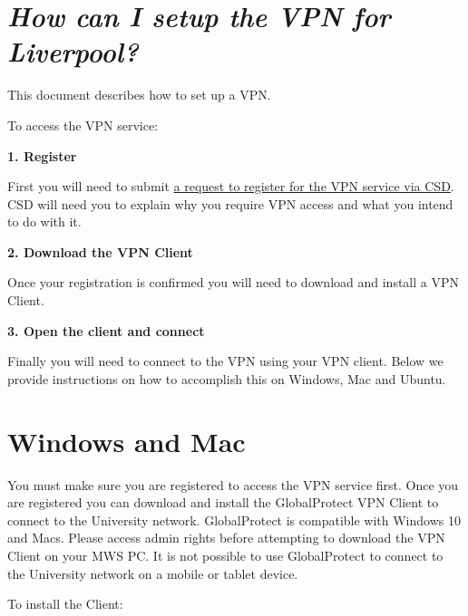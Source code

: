 \documentclass[
]{book}
\begin{document}
\hypertarget{how-can-i-setup-the-vpn-for-liverpool}{%
\section{\texorpdfstring{\emph{How can I setup the VPN for Liverpool?}}{How can I setup the VPN for Liverpool?}}\label{how-can-i-setup-the-vpn-for-liverpool}}

This document describes how to set up a VPN.

To access the VPN service:

\textbf{1. Register}

First you will need to submit \href{https://liverpool.service-now.com/sp?id=sc_cat_item\&sys_id=bd8d37f1376ba60051a3532e53990e3f}{a request to register for the VPN service via CSD}. CSD will need you to explain why you require VPN access and what you intend to do with it.

\textbf{2. Download the VPN Client}

Once your registration is confirmed you will need to download and install a VPN Client.

\textbf{3. Open the client and connect}

Finally you will need to connect to the VPN using your VPN client. Below we provide instructions on how to accomplish this on Windows, Mac and Ubuntu.

\hypertarget{windows-and-mac}{%
\section{Windows and Mac}\label{windows-and-mac}}

You must make sure you are registered to access the VPN service first.
Once you are registered you can download and install the GlobalProtect VPN Client to connect to the University network.
GlobalProtect is compatible with Windows 10 and Macs.
Please access admin rights before attempting to download the VPN Client on your MWS PC.
It is not possible to use GlobalProtect to connect to the University network on a mobile or tablet device.

To install the Client:
\end{document}
